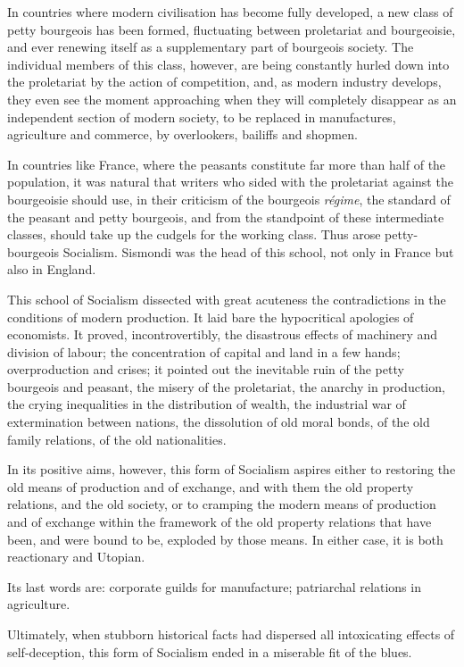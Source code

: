 In countries where modern civilisation has become fully developed, a new class of petty bourgeois has been formed, fluctuating between proletariat and bourgeoisie, and ever renewing itself as a supplementary part of bourgeois society. The individual members of this class, however, are being constantly hurled down into the proletariat by the action of competition, and, as modern industry develops, they even see the moment approaching when they will completely disappear as an independent section of modern society, to be replaced in manufactures, agriculture and commerce, by overlookers, bailiffs and shopmen. 

In countries like France, where the peasants constitute far more than half of the population, it was natural that writers who sided with the proletariat against the bourgeoisie should use, in their criticism of the bourgeois \emph{régime}, the standard of the peasant and petty bourgeois, and from the standpoint of these intermediate classes, should take up the cudgels for the working class. Thus arose petty-bourgeois Socialism. Sismondi was the head of this school, not only in France but also in England. 

This school of Socialism dissected with great acuteness the contradictions in the conditions of modern production. It laid bare the hypocritical apologies of economists. It proved, incontrovertibly, the disastrous effects of machinery and division of labour; the concentration of capital and land in a few hands; overproduction and crises; it pointed out the inevitable ruin of the petty bourgeois and peasant, the misery of the proletariat, the anarchy in production, the crying inequalities in the distribution of wealth, the industrial war of extermination between nations, the dissolution of old moral bonds, of the old family relations, of the old nationalities. 

In its positive aims, however, this form of Socialism aspires either to restoring the old means of production and of exchange, and with them the old property relations, and the old society, or to cramping the modern means of production and of exchange within the framework of the old property relations that have been, and were bound to be, exploded by those means. In either case, it is both reactionary and Utopian. 

Its last words are: corporate guilds for manufacture; patriarchal relations in agriculture. 

Ultimately, when stubborn historical facts had dispersed all intoxicating effects of self-deception, this form of Socialism ended in a miserable fit of the blues. 

